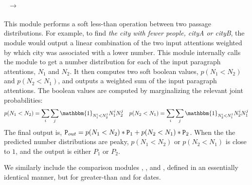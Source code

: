 \documentclass[main.tex]{subfiles}
\begin{document}
\paragraph{~$\rightarrow$~\typePara}\mbox{}%
\noindent
This module performs a soft less-than operation between two passage distributions. For example, to find \textit{the city with fewer people, cityA or cityB},
the module would output a linear combination of the two input attentions weighted by which city was associated with a lower number.
%
This module internally calls the  module to get a number distribution for each of the input paragraph attentions, $N_{1}$ and $N_{2}$. It then computes two soft boolean values, $p(N_{1} < N_{2})$ and $p(N_{2} < N_{1})$, and outputs a weighted sum of the input paragraph attentions. The boolean values are computed by marginalizing the relevant joint probabilities:
\begin{align*}
    p(N_{1} < N_{2}) = \sum_{i} \sum_{j}  \mathbbm{1}_{N_1^{i} < N_2^{j}} N_1^{i} N_2^{j} &&
    p(N_{2} < N_{1}) = \sum_{i} \sum_{j}  \mathbbm{1}_{N_2^{i} < N_1^{j}} N_2^{i} N_1^{j}
\end{align*}
The final output is, $\texttt{P}_{out} = p(N_{1} < N_{2}) * \texttt{P}_{1} + p(N_{2} < N_{1}) * \texttt{P}_{2}$.
When the the predicted number distributions are peaky, $p(N_{1} < N_{2})$ or $p(N_{2} < N_{1})$ is close to $1$, and the output is either $P_{1}$ or $P_{2}$.

We similarly include the comparison modules , , and , defined in an essentially identical manner, but for greater-than and for dates.


\end{document}
